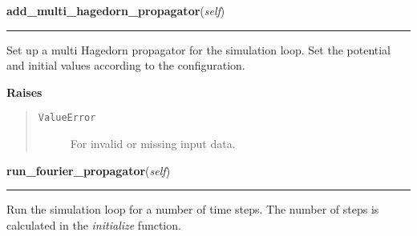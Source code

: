     \label{SimulationLoop:SimulationLoop:add_multi_hagedorn_propagator}

    \vspace{0.5ex}

\hspace{.8\funcindent}\begin{boxedminipage}{\funcwidth}

    \raggedright \textbf{add\_multi\_hagedorn\_propagator}(\textit{self})

    \vspace{-1.5ex}

    \rule{\textwidth}{0.5\fboxrule}
\setlength{\parskip}{2ex}
    Set up a multi Hagedorn propagator for the simulation loop. Set the
    potential and initial values according to the configuration.

\setlength{\parskip}{1ex}
      \textbf{Raises}
    \vspace{-1ex}

      \begin{quote}
        \begin{description}

          \item[\texttt{ValueError}]

          For invalid or missing input data.

        \end{description}

      \end{quote}

    \end{boxedminipage}

    \label{SimulationLoop:SimulationLoop:run_fourier_propagator}

    \vspace{0.5ex}

\hspace{.8\funcindent}\begin{boxedminipage}{\funcwidth}

    \raggedright \textbf{run\_fourier\_propagator}(\textit{self})

    \vspace{-1.5ex}

    \rule{\textwidth}{0.5\fboxrule}
\setlength{\parskip}{2ex}
    Run the simulation loop for a number of time steps. The number of steps
    is calculated in the \textit{initialize} function.

\setlength{\parskip}{1ex}
    \end{boxedminipage}

